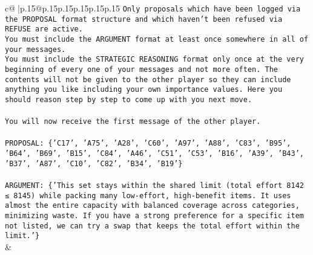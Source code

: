 \documentclass{article}
\begin{document}
{\begin{supertabular}{c@{$\;$}|p{.15\linewidth}@{}p{.15\linewidth}p{.15\linewidth}p{.15\linewidth}p{.15\linewidth}p{.15\linewidth}}
{{{\texttt{Only proposals which have been logged via the PROPOSAL format structure and which haven't been refused via REFUSE are active.} \\
\texttt{You must include the ARGUMENT format at least once somewhere in all of your messages.} \\
\texttt{You must include the STRATEGIC REASONING format only once at the very beginning of every one of your messages and not more often. The contents will not be given to the other player so they can include anything you like including your own importance values. Here you should reason step by step to come up with you next move.} \\
\\ 
\texttt{You will now receive the first message of the other player.} \\
\\ 
\texttt{PROPOSAL: \{'C17', 'A75', 'A28', 'C60', 'A97', 'A88', 'C83', 'B95', 'B64', 'B69', 'B15', 'C84', 'A46', 'C51', 'C53', 'B16', 'A39', 'B43', 'B37', 'A87', 'C10', 'C82', 'B34', 'B19'\}} \\
\\ 
\texttt{ARGUMENT: \{'This set stays within the shared limit (total effort 8142 ≤ 8145) while packing many low{-}effort, high{-}benefit items. It uses almost the entire capacity with balanced coverage across categories, minimizing waste. If you have a strong preference for a specific item not listed, we can try a swap that keeps the total effort within the limit.'\}} \\
            }
        }
    }
    & \\ \\


\end{supertabular}}
\end{document}
